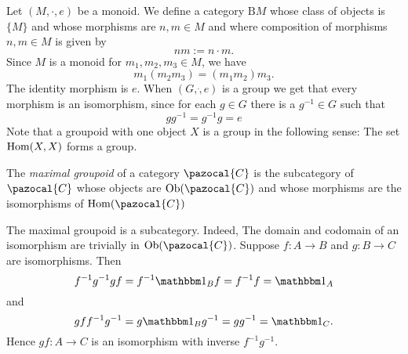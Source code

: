 \begin{example}\label{MonoidIsACategoryGroupIsGroupoid}
    Let $(M,\cdot,e)$ be a monoid. We define a category $\mathrm{B}M$ whose class of objects is $\{M\}$ and whose morphisms are $n,m\in M$ and where composition of morphisms $n,m\in M$ is given by 
    $$nm := n\cdot m.$$  
    Since $M$ is a monoid for $m_1,m_2,m_3\in M$, we have 
    $$m_1(m_2m_3)=(m_1m_2)m_3.$$
    The identity morphism is $e$. When $(G,\dot,e)$ is a group we get that every morphism is an isomorphism, since for each $g\in G$ there is a $g^{-1}\in G$ such that 
    $$gg^{-1}=g^{-1}g = e$$ 
    Note that a groupoid with one object $X$ is a group in the following sense: The set $\mathrm{Hom}(X,X)$ forms a group.
\end{example}
\begin{definition}
    The \textit{maximal groupoid} of a category $\pazocal{C}$ is the subcategory of $\pazocal{C}$ whose objects are $\Ob(\pazocal{C})$ and whose morphisms are the isomorphisms of $\Hom(\pazocal{C})$
\end{definition}
\begin{remark}
    The maximal groupoid is a subcategory. Indeed, The domain and codomain of an isomorphism are trivially in $\Ob(\pazocal{C})$. Suppose $f:A\rightarrow B$ and $g: B \rightarrow C$ are isomorphisms. Then 
    $$f^{-1}g^{-1}gf=f^{-1}\fone_B f = f^{-1}f = \fone_A$$
    and 
    $$gff^{-1}g^{-1} = g\fone_B g^{-1} = gg^{-1} = \fone_C.$$
    Hence $gf: A \rightarrow C$ is an isomorphism with inverse $f^{-1}g^{-1}$. 
\end{remark}

